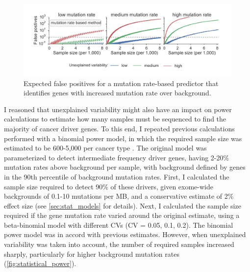 \begin{figure}
  \centering
  \makeatletter
  \let\@currsize\normalsize
  \includegraphics[width=0.9\linewidth]{figures/chapter2/expected_false_positives_mutation_rate.pdf}
  \caption[Expected false positives for driver gene detection]{Expected false positives for a mutation rate-based predictor that identifies genes with increased mutation rate over background.}
  \label{fig:expected_fp}
\end{figure}

I reasoned that unexplained variability might also have an impact on power calculations to estimate how many samples must be sequenced to find the majority of cancer driver genes. To this end, I repeated previous calculations performed with a binomial power model, in which the required sample size was estimated to be 600-5,000 per cancer type \cite{RN14}. The original model was parameterized to detect intermediate frequency driver genes, having 2-20\% mutation rates above background per sample, with background defined by genes in the 90th percentile of background mutation rates. First, I calculated the sample size required to detect 90\% of these drivers, given exome-wide backgrounds of 0.1-10 mutations per MB, and a conservative estimate of 2\% effect size (see \autoref{sec:stat_models} for details). Next, I calculated the sample size required if the gene mutation rate varied around the original estimate, using a beta-binomial model with different CVs (CV = 0.05, 0.1, 0.2). The binomial power model was in accord with previous estimates. However, when unexplained variability was taken into account, the number of required samples increased sharply, particularly for higher background mutation rates (\autoref{fig:statistical_power}).

